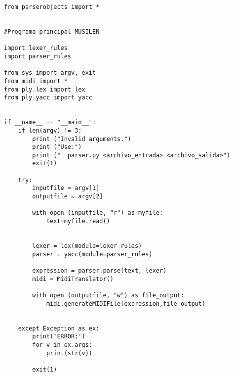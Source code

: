 \begin{verbatim}
from parserobjects import *


#Programa principal MUSILEN

import lexer_rules
import parser_rules

from sys import argv, exit
from midi import *
from ply.lex import lex
from ply.yacc import yacc


if __name__ == "__main__":
    if len(argv) != 3:
        print ("Invalid arguments.")
        print ("Use:")
        print ("  parser.py <archivo_entrada> <archivo_salida>")
        exit(1)

    try:
        inputfile = argv[1]
        outputfile = argv[2]

        with open (inputfile, "r") as myfile:
            text=myfile.read()


        lexer = lex(module=lexer_rules)
        parser = yacc(module=parser_rules)

        expression = parser.parse(text, lexer)
        midi = MidiTranslator()

        with open (outputfile, "w") as file_output:
            midi.generateMIDIFile(expression,file_output)


    except Exception as ex:
        print('ERROR:')
        for v in ex.args:
            print(str(v))

        exit(1)
\end{verbatim}

